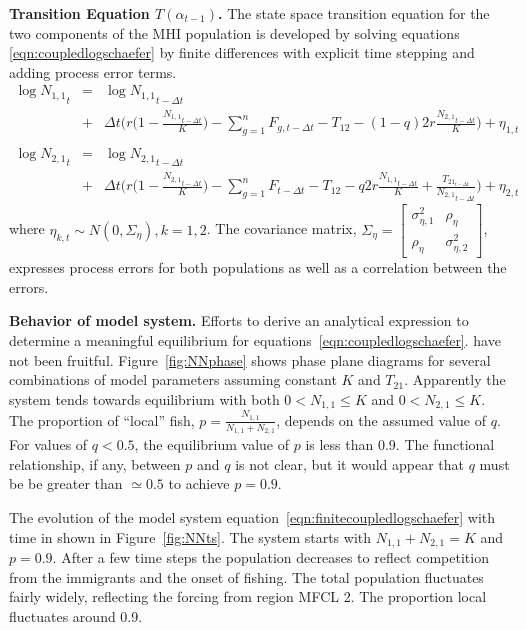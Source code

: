 \documentclass[12pt,letterpaper]{article}
\newcommand\None{{N_{1,1}}}
\newcommand\Ntwo{{N_{2,1}}}
\newcommand\Nsum{{N_{1,1}+N_{2,1}}}
\begin{document}
{\bf Transition Equation $T(\alpha_{t-1})$.}
The state space transition equation for the two components of the MHI
population is developed by solving
equations \ref{eqn:coupledlogschaefer} by finite differences
with explicit time stepping and adding process error
terms.
\begin{eqnarray}
\log \None_t &=& \log \None_{t-\Delta t}\nonumber\\ 
             &+&\Delta t\bigg(r\Big(1-\frac{\None_{t-\Delta t}}{K}\Big)
-\sum_{g=1}^n F_{g,t-\Delta t} - T_{12} - (1-q)2r\frac{\Ntwo_{t-\Delta
t}}{K}\bigg)+\eta_{1,t}\nonumber\\
\\ \log \Ntwo_t &=& \log \Ntwo_{t-\Delta t}\nonumber\\
             &+&\Delta t\bigg(r\Big(1-\frac{\Ntwo_{t-\Delta t}}{K}\Big)
-\sum_{g=1}^n F_{t-\Delta t} - T_{12} - q2r\frac{\None_{t-\Delta t}}{K}
     +\frac{T_{{21}_{t-\Delta t}}}{\Ntwo_{t-\Delta t}}\bigg)+\eta_{2,t}\nonumber
\label{eqn:finitecoupledlogschaefer}
\end{eqnarray}
where $\eta_{k,t} \sim N(0,\Sigma_\eta),k=1,2$. The covariance matrix,
$\Sigma_\eta = \left[\begin{array}{cc}\sigma^2_{\eta,1}&\rho_\eta\\
                                     \rho_\eta&\sigma^2_{\eta,2}
\end{array}\right]$,
expresses process errors for both populations as well as a
correlation between the errors.

{\bf Behavior of model system.}
Efforts to derive an analytical expression to determine 
a meaningful equilibrium for equations~\ref{eqn:coupledlogschaefer}.
have not been fruitful.
Figure~\ref{fig:NNphase} shows phase plane diagrams for several
combinations of model parameters assuming constant $K$ and
$T_{21}$. Apparently the system tends towards
equilibrium with both $0 < \None \le K$ and $0 < \Ntwo \le K$.
The proportion of ``local'' fish, $p = \frac{\None}{\Nsum}$, depends on
the assumed value of $q$. For values of $q < 0.5$, the equilibrium
value of $p$ is less than 0.9. The functional relationship, if any,
between $p$ and $q$ is not clear, but it would appear that $q$ must be
be greater than $\simeq 0.5$ to achieve $p=0.9$.

The evolution of the model system
equation~\ref{eqn:finitecoupledlogschaefer} with time in shown in
Figure~\ref{fig:NNts}. The system starts with $\None + \Ntwo = K$ and
$p=0.9$. After a few time steps the population decreases to reflect
competition from the immigrants and the onset of fishing.
The total population fluctuates fairly widely, reflecting the forcing
from region MFCL 2. The proportion local fluctuates around 0.9.
\end{document}
